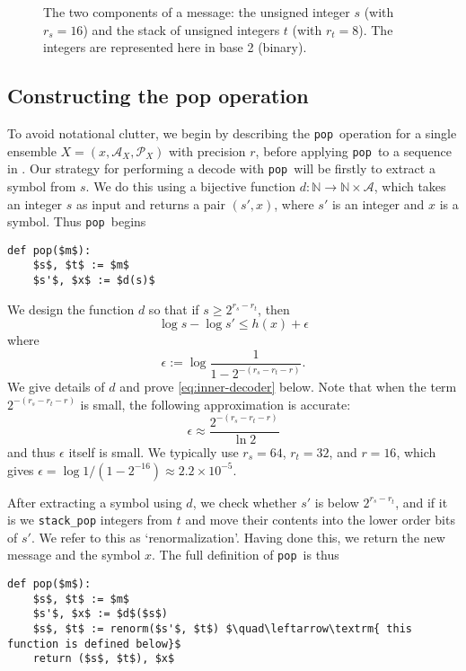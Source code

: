 \documentclass{article}
\theoremstyle{definition}
\newcommand{\pop}{\texttt{pop}}
\begin{document}
  \begin{figure}[ht]
    \centering
    \drawmessage
    \caption{
      The two components of a message: the unsigned integer \(s\) (with \(r_s =
      16\)) and the stack of unsigned integers \(t\) (with \(r_t = 8\)). The
      integers are represented here in base 2 (binary).
  }
    \label{fig:message}
  \end{figure}


\subsection{Constructing the pop operation}
  To avoid notational clutter, we begin by describing the \pop\ operation for a
  single ensemble \(X = (x, \mathcal{A}_X, \mathcal{P}_X)\) with precision
  \(r\), before applying \pop\ to a sequence in . Our
  strategy for performing a decode with \pop\ will be firstly to extract a
  symbol from \(s\). We do this using a bijective function \(d:\mathbb
  N\rightarrow\mathbb N\times\mathcal{A}\), which takes an integer \(s\) as
  input and returns a pair \((s', x)\), where \(s'\) is an integer and \(x\) is
  a symbol.  Thus \pop\ begins
  \begin{lstlisting}
def pop($m$):
    $s$, $t$ := $m$
    $s'$, $x$ := $d(s)$
  \end{lstlisting}
  We design the function \(d\) so that if \(s\geq 2^{r_s - r_t}\), then
  \begin{equation}\label{eq:inner-decoder}
    \log s - \log s' \leq h(x) + \epsilon
  \end{equation}
  where
  \begin{equation}
    \epsilon := \log \frac{1}{1 - 2^{-(r_s - r_t - r)}}.
  \end{equation}
  We give details of \(d\) and prove \cref{eq:inner-decoder} below. Note that
  when the term \(2^{-(r_s - r_t - r)}\) is small, the following approximation
  is accurate:
  \begin{equation}
    \epsilon \approx \frac{2^{-(r_s - r_t - r)}}{\ln 2}
  \end{equation}
  and thus $\epsilon$ itself is small. We typically use \(r_s = 64\), \(r_t =
  32\), and \(r = 16\), which gives \(\epsilon = \log 1/(1 - 2^{-16}) \approx
  2.2 \times 10^{-5}\).

  After extracting a symbol using \(d\), we check whether \(s'\) is below
  \(2^{r_s - r_t}\), and if it is we \texttt{stack\_pop} integers from \(t\)
  and move their contents into the lower order bits of \(s'\). We refer to this
  as `renormalization'.  Having done this, we return the new message and the
  symbol \(x\). The full definition of \pop\ is thus
  \begin{lstlisting}[frame=single]
def pop($m$):
    $s$, $t$ := $m$
    $s'$, $x$ := $d$($s$)
    $s$, $t$ := renorm($s'$, $t$) $\quad\leftarrow\textrm{ this function is defined below}$
    return ($s$, $t$), $x$
  \end{lstlisting}
\end{document}
